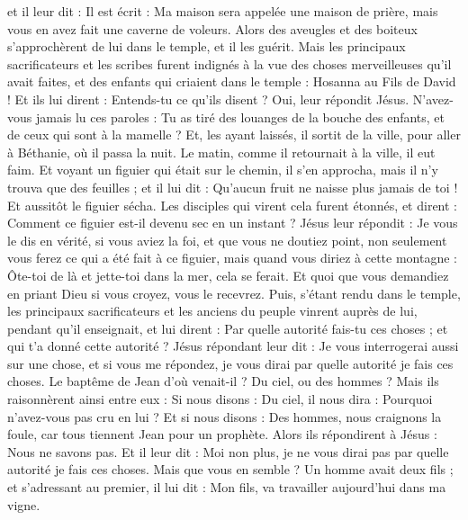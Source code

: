 \begin{multicols}{2}
et il leur dit : Il est écrit : Ma maison sera appelée une maison de prière, mais vous en avez fait une caverne de voleurs.
Alors des aveugles et des boiteux s’approchèrent de lui dans le temple, et il les guérit.
Mais les principaux sacrificateurs et les scribes furent indignés à la vue des choses merveilleuses qu'il avait faites, et des enfants qui criaient dans le temple : Hosanna au Fils de David !
Et ils lui dirent : Entends-tu ce qu’ils disent ? Oui, leur répondit Jésus. N'avez-vous jamais lu ces paroles : Tu as tiré des louanges de la bouche des enfants, et de ceux qui sont à la mamelle ?
Et, les ayant laissés, il sortit de la ville, pour aller à Béthanie, où il passa la nuit.
Le matin, comme il retournait à la ville, il eut faim.
Et voyant un figuier qui était sur le chemin, il s'en approcha, mais il n'y trouva que des feuilles ; et il lui dit : Qu'aucun fruit ne naisse plus jamais de toi ! Et aussitôt le figuier sécha.
Les disciples qui virent cela furent étonnés, et dirent : Comment ce figuier est-il devenu sec en un instant ?
Jésus leur répondit : Je vous le dis en vérité, si vous aviez la foi, et que vous ne doutiez point, non seulement vous ferez ce qui a été fait à ce figuier, mais quand vous diriez à cette montagne : Ôte-toi de là et jette-toi dans la mer, cela se ferait.
Et quoi que vous demandiez en priant Dieu si vous croyez, vous le recevrez.
Puis, s’étant rendu dans le temple, les principaux sacrificateurs et les anciens du peuple vinrent auprès de lui, pendant qu’il enseignait, et lui dirent : Par quelle autorité fais-tu ces choses ; et qui t'a donné cette autorité ?
Jésus répondant leur dit : Je vous interrogerai aussi sur une chose, et si vous me répondez, je vous dirai par quelle autorité je fais ces choses.
Le baptême de Jean d'où venait-il ? Du ciel, ou des hommes ? Mais ils raisonnèrent ainsi entre eux : Si nous disons : Du ciel, il nous dira : Pourquoi n’avez-vous pas cru en lui ?
Et si nous disons : Des hommes, nous craignons la foule, car tous tiennent Jean pour un prophète.
Alors ils répondirent à Jésus : Nous ne savons pas. Et il leur dit : Moi non plus, je ne vous dirai pas par quelle autorité je fais ces choses.
Mais que vous en semble ? Un homme avait deux fils ; et s’adressant au premier, il lui dit : Mon fils, va travailler aujourd'hui dans ma vigne.

\end{multicols}
